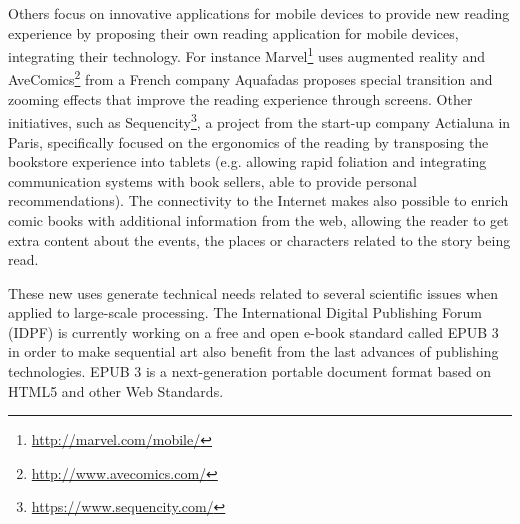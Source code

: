 Others focus on innovative applications for mobile devices to provide new reading experience by proposing their own reading application for mobile devices, integrating their technology.
For instance Marvel\footnote{\url{http://marvel.com/mobile/}} uses augmented reality and AveComics\footnote{\url{http://www.avecomics.com/}} from a French company Aquafadas proposes special transition and zooming effects that improve the reading experience through screens.
Other initiatives, such as Sequencity\footnote{\url{https://www.sequencity.com/}}, a project from the start-up company Actialuna in Paris, specifically focused on the ergonomics of the reading by transposing the bookstore experience into tablets (e.g. allowing rapid foliation and integrating communication systems with book sellers, able to provide personal recommendations).
The connectivity to the Internet makes also possible to enrich comic books with additional information from the web,
allowing the reader to get extra content about the events, the places or characters related to the story being read.

These new uses generate technical needs related to several scientific issues when applied to large-scale processing. 
The International Digital Publishing Forum (IDPF) is currently working on a free and open e-book standard called EPUB 3 in order to make sequential art also benefit from the last advances of publishing technologies.
EPUB 3 is a next-generation portable document format based on HTML5 and other Web Standards.







